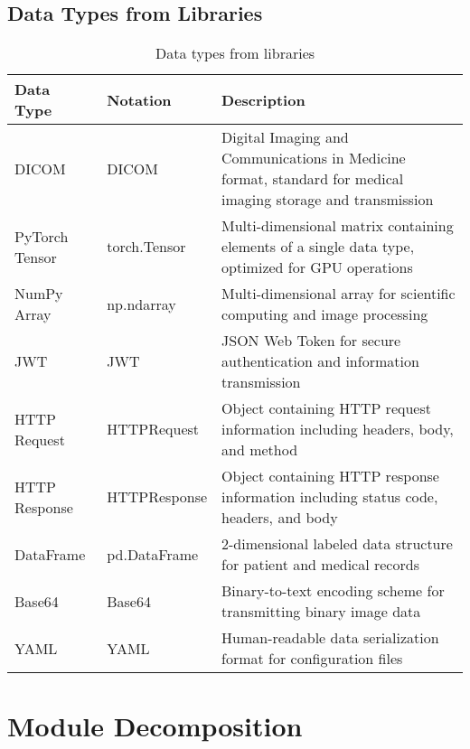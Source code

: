 \documentclass[12pt, titlepage]{article}
\begin{document}
\subsection{Data Types from Libraries}
\begin{table}[H]
    \centering
    \renewcommand{\arraystretch}{1.2}
    \noindent
    \begin{tabular}{l l p{7.5cm}}
    \toprule
    \textbf{Data Type} & \textbf{Notation} & \textbf{Description} \\
    \midrule
    DICOM & DICOM & Digital Imaging and Communications in Medicine format, standard for medical imaging storage and transmission \\
    PyTorch Tensor & torch.Tensor & Multi-dimensional matrix containing elements of a single data type, optimized for GPU operations \\
    NumPy Array & np.ndarray & Multi-dimensional array for scientific computing and image processing \\
    JWT & JWT & JSON Web Token for secure authentication and information transmission \\
    HTTP Request & HTTPRequest & Object containing HTTP request information including headers, body, and method \\
    HTTP Response & HTTPResponse & Object containing HTTP response information including status code, headers, and body \\
    DataFrame & pd.DataFrame & 2-dimensional labeled data structure for patient and medical records \\
    Base64 & Base64 & Binary-to-text encoding scheme for transmitting binary image data \\
    YAML & YAML & Human-readable data serialization format for configuration files \\
    \bottomrule
    \end{tabular}
    \caption{Data types from libraries}
    \end{table}

\newpage
\section{Module Decomposition}
\end{document}
